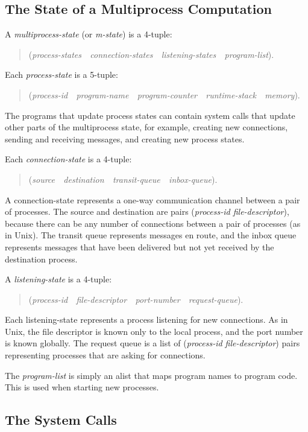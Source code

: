 \documentclass{article}
\begin{document}
\subsection{The State of a Multiprocess Computation}

A \emph{multiprocess-state} (or \emph{m-state}) is a 4-tuple:
\begin{quote}
(\emph{process-states\ \ connection-states\ \ listening-states\ \ program-list}).
\end{quote}
Each \emph{process-state} is a 5-tuple:
\begin{quote}
(\emph{process-id\ \ program-name\ \ program-counter\ \ runtime-stack\ \ memory}).
\end{quote}
The programs that update process states can contain system
calls that update other parts of the multiprocess state,
for example, creating new connections, sending and receiving
messages, and creating new process states.

Each \emph{connection-state} is a 4-tuple:
\begin{quote}
(\emph{source\ \ destination\ \ transit-queue\ \ inbox-queue}).
\end{quote}
A connection-state represents a one-way communication channel
between a pair of processes.  The source and destination are
pairs (\emph{process-id file-descriptor}), because
there can be any number of connections between a pair of
processes (as in Unix).  The transit queue represents messages
en route, and the inbox queue represents messages
that have been delivered but not yet received by the destination
process.

A \emph{listening-state} is a 4-tuple:
\begin{quote}
(\emph{process-id\ \ file-descriptor\ \ port-number\ \ request-queue}).
\end{quote}
Each listening-state represents a process listening for new connections.
As in Unix, the file descriptor is known only to
the local process, and the port number is known globally.
The request queue is a list of (\emph{process-id file-descriptor})
pairs representing processes that are asking for connections.

The \emph{program-list} is simply an alist that maps program
names to program code.  This is used when starting new processes.

\subsection{The System Calls}
\end{document}
